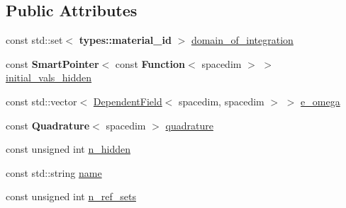 \subsection*{Public Attributes}
\begin{DoxyCompactItemize}
\item 
const std\+::set$<$ {\bf types\+::material\+\_\+id} $>$ \hyperlink{class_scalar_functional_3_01spacedim_00_01spacedim_01_4_aa192395f822a64f60df43bf9d36c2f3a}{domain\+\_\+of\+\_\+integration}
\item 
const {\bf Smart\+Pointer}$<$ const {\bf Function}$<$ spacedim $>$ $>$ \hyperlink{class_scalar_functional_3_01spacedim_00_01spacedim_01_4_ae3282d5182360e0030e4cc5e02fbe2eb}{initial\+\_\+vals\+\_\+hidden}
\item 
const std\+::vector$<$ \hyperlink{class_dependent_field}{Dependent\+Field}$<$ spacedim, spacedim $>$ $>$ \hyperlink{class_scalar_functional_3_01spacedim_00_01spacedim_01_4_adfed9b70b743ba245a39c3e63b951f96}{e\+\_\+omega}
\item 
const {\bf Quadrature}$<$ spacedim $>$ \hyperlink{class_scalar_functional_3_01spacedim_00_01spacedim_01_4_ab83ee3ae077b211137824b006098382e}{quadrature}
\item 
const unsigned int \hyperlink{class_scalar_functional_3_01spacedim_00_01spacedim_01_4_a7df6711471715f907bc9911449c5c825}{n\+\_\+hidden}
\item 
const std\+::string \hyperlink{class_scalar_functional_3_01spacedim_00_01spacedim_01_4_a195248af3821548af3000872e9e6d00e}{name}
\item 
const unsigned int \hyperlink{class_scalar_functional_3_01spacedim_00_01spacedim_01_4_acee2c3c289e5b2b680996facc2f79e78}{n\+\_\+ref\+\_\+sets}
\end{DoxyCompactItemize}
